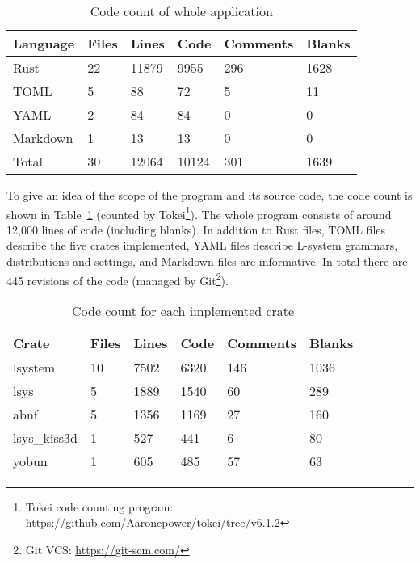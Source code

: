 \begin{table}
    \centering
    \begin{tabular}{| l | l | l | l | l | l |}
    \hline
    Language           & Files       & Lines       &  Code    & Comments      & Blanks \\
    \hline
    Rust               &    22       & 11879       &  9955    &      296      &   1628 \\
    TOML               &     5       &    88       &    72    &        5      &     11 \\
    YAML               &     2       &    84       &    84    &        0      &      0 \\
    Markdown           &     1       &    13       &    13    &        0      &      0 \\
    \hline
    Total              &    30       & 12064       & 10124    &      301      &   1639 \\
    \hline
    \end{tabular}
    \caption{Code count of whole application}
    \label{tab:lsys-count}
\end{table}

To give an idea of the scope of the program and its source code, the code count is shown in Table~\ref{tab:lsys-count} (counted by Tokei\footnote{Tokei code counting program: \url{https://github.com/Aaronepower/tokei/tree/v6.1.2}}).
The whole program consists of around 12,000 lines of code (including blanks).
In addition to Rust files, TOML files describe the five crates implemented, YAML files describe \gls{L-system} grammars, distributions and settings, and Markdown files are informative.
In total there are 445 revisions of the code (managed by Git\footnote{Git \gls{VCS}: \url{https://git-scm.com/}}).

\begin{table}
    \centering
    \begin{tabular}{| l | l | l | l | l | l |}
    \hline
    Crate           & Files       & Lines       &  Code    & Comments      & Blanks \\
    \hline
    lsystem        & 10           & 7502        & 6320     & 146           & 1036 \\
    lsys           & 5            & 1889        & 1540     &  60           &  289 \\
    abnf           & 5            & 1356        & 1169     &  27           &  160 \\
    lsys\_kiss3d   & 1            &  527        &  441     &   6           &   80 \\
    yobun          & 1            &  605        &  485     &  57           &   63 \\
    \hline
    \end{tabular}
    \caption{Code count for each implemented crate}
    \label{tab:lsys-crate-count}
\end{table}

